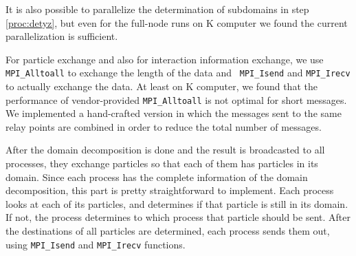 It is also possible to parallelize  the determination of  subdomains in
step \ref{proc:detyz}, but even for the full-node runs on K computer
we found the current parallelization is sufficient.

For particle exchange and also for interaction information exchange,
we use {\tt MPI\_Alltoall} to exchange the length of the data and {\tt
MPI\_Isend} and {\tt MPI\_Irecv} to actually exchange the data. At
least on K computer, we found that the performance of vendor-provided
{\tt MPI\_Alltoall} is not optimal for short messages. We implemented
a hand-crafted version in which the messages sent to the same relay
points are combined in order to reduce the total number of messages.


After the domain decomposition is done and the result is broadcasted
to all processes, they exchange particles so that each of them has
particles in its domain. Since each process has the complete
information of the domain decomposition, this part is pretty
straightforward to implement. Each process looks at each of its
particles, and determines if that particle is still in its domain.  If
not, the process determines to which process that particle should be
sent. After the destinations of all particles are determined, each
process sends them out, using {\tt MPI\_Isend} and {\tt MPI\_Irecv}
functions.


